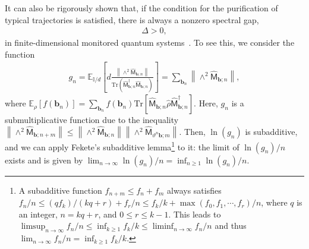 \documentclass[preprint,pteplogo]{ptephy_v2}%
\numberwithin{equation}{section}
\theoremstyle{definition}
\begin{document}
It can also be rigorously shown that, if the condition for the purification of typical trajectories is satisfied, there is always a nonzero spectral gap,
\begin{align}
    \Delta>0,
    \label{eq:nonzero-gap}
\end{align}
in finite-dimensional monitored quantum systems~\cite{benoist2019invariant}. 
To see this, we consider the function
\begin{align}
    g_n=\mathbb{E}_{\mathbb{I}/d}\left[d\frac{\left\|\land^2\hat{\mathsf{M}}_{\bm{b};n}\right\|}
    {\mathrm{Tr}\left(\hat{\mathsf{M}}_{\bm{b};n}^\dagger\hat{\mathsf{M}}_{\bm{b};n}\right)}\right]
    =\sum_{\bm{b}_n}\left\|\land^2\hat{\mathsf{M}}_{\bm{b};n}\right\|,
\end{align}
where $\mathbb{E}_\rho[f(\bm{b}_n)]=\sum_{\bm{b}_n}f(\bm{b}_n)\mathrm{Tr}\left[\hat{\mathsf{M}}_{\bm{b};n}\hat{\rho}\hat{\mathsf{M}}_{\bm{b};n}^\dagger\right]$. 
Here, $g_n$ is a submultiplicative function due to the inequality $\left\|\land^2\hat{\mathsf{M}}_{\bm{b};n+m}\right\|\leq\left\|\land^2\hat{\mathsf{M}}_{\bm{b};n}\right\|\left\|\land^2\hat{\mathsf{M}}_{\vartheta^n\bm{b};m}\right\|$. 
Then, $\ln(g_n)$ is subadditive, and we can apply Fekete's subadditive lemma\footnote{
A subadditive function $f_{n+m}\leq f_n+f_m$ always satisfies $f_n/n \leq (qf_k)/(kq+r)+f_r/n \leq f_k/k+\max(f_0,f_1,\cdots,f_r)/n$, where $q$ is an integer, $n=kq+r$, and $0\leq r \leq k-1$. 
This leads to $\limsup_{n\rightarrow\infty}f_n/n\leq\inf_{k\geq1}f_k/k\leq\liminf_{n\rightarrow\infty}f_n/n$ and thus $\lim_{n\rightarrow\infty}f_n/n=\inf_{k\geq1}f_k/k$.
} to it: the limit of $\ln(g_n)/n$ exists and is given by $\lim_{n\rightarrow\infty}\ln(g_n)/n=\inf_{n\geq1}\ln(g_n)/n$. 
\end{document}
